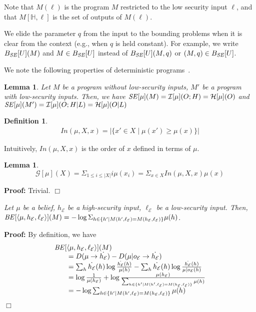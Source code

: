 \documentclass{llncs}
\newtheorem{definition}[theorem]{Definition}
\newtheorem{lemma}[theorem]{Lemma}
\newenvironment{proof}{\noindent\rm{\bf Proof:}}{\hbox{$\Box$}\vspace*{0.2\baselineskip}}
\newenvironment{reflemma}[1]{\begin{trivlist}\item[\hskip
      \labelsep{\bf Lemma #1.}]\it}{\end{trivlist}}
\newcommand{\aset}[1]{\{{#1}\}}
\begin{document}
Note that $M(\ell)$ is the program $M$ restricted to the low security
input $\ell$, and that $M[\mathbb{H},\ell]$ is the set of outputs of
$M(\ell)$.

We elide the parameter $q$ from the input to the bounding problems when
it is clear from the context (e.g., when $q$ is held constant).  For
example, we write $B_{\it SE}[U](M)$ and $M \in B_{\it SE}[U]$ instead
of $B_{\it SE}[U](M,q)$ or $(M,q) \in B_{\it SE}[U]$.

We note the following properties of deterministic
programs~\cite{clark05}.
\begin{lemma}
\label{lem:detse}
Let $M$ be a program without low-security inputs, $M'$ be a program
with low-security inputs.  Then, we have
${\it SE}[\mu](M)=\mathcal{I}[\mu](O;H)=\mathcal{H}[\mu](O)$
and
${\it SE}[\mu](M')=\mathcal{I}[\mu](O;H|L) = \mathcal{H}[\mu](O|L)$
\end{lemma}

\begin{definition}
\[
\begin{array}{l}
In(\mu,X,x)=|\aset{x'\in X\mid \mu(x')\ge\mu(x)}|
\end{array}
\]
\end{definition}
Intuitively, $In(\mu,X,x)$ is the order of $x$ defined in terms of
$\mu$.

\begin{lemma}
\[
{\mathcal G}[\mu](X)=\Sigma_{1\le i\le |X|}i\mu(x_i)=\Sigma_{x\in X}In(\mu,X,x)\mu(x)
\]
\end{lemma}
\begin{proof}
Trivial.
\end{proof}

\begin{reflemma}{\ref{lem:be}}
  Let $\mu$ be a belief, $h_\mathcal{E}$ be a high-security input,
  $\ell_\mathcal{E}$ be a low-security input.  Then, ${\it
    BE}[\langle
    \mu,h_\mathcal{E},\ell_\mathcal{E}\rangle](M)=-\log\Sigma_{h\in
    \aset{h'\mid
      M(h',\ell_\mathcal{E})=M(h_\mathcal{E},\ell_\mathcal{E})}}
  \mu(h)$.
\end{reflemma}
\begin{proof}
By definition, we have
\[
\begin{array}{l}
  {\it BE}[\langle
    \mu,h_\mathcal{E},\ell_\mathcal{E}\rangle](M) \\
  \qquad =D(\mu\rightarrow \dot{h_\mathcal{E}})-D(\mu |
  o_\mathcal{E}\rightarrow
  \dot{h_\mathcal{E}})\\
  \qquad =\sum_h
  \dot{h_\mathcal{E}}(h)\log\frac{\dot{h_\mathcal{E}}(h)}{\mu(h)} -
  \sum_h \dot{h_\mathcal{E}}(h)\log\frac{\dot{h_\mathcal{E}}(h)}{\mu |
    o_\mathcal{E}(h)}\\
  \qquad =\log\frac{1}{\mu(h_\mathcal{E})} +\log\frac{\mu(h_\mathcal{E})}{\sum_{h\in \aset{h'\mid M(h',\ell_\mathcal{E}) =
    M(h_\mathcal{E},\ell_\mathcal{E})}} \mu(h)}\\
\qquad=-\log\sum_{h\in \aset{h'\mid M(h',\ell_\mathcal{E}) =
    M(h_\mathcal{E},\ell_\mathcal{E})}} \mu(h)

\end{array}
\]

\end{proof}
\end{document}
